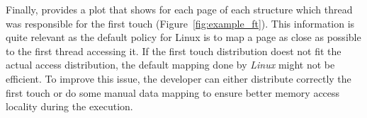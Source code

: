 Finally, \TABARNAC provides a plot that shows for each page of each structure
which thread was responsible for the first touch
(Figure~\ref{fig:example_ft}). This information is quite relevant as the
default policy for Linux is to map a page as close as possible to the first
thread accessing it. If the first touch distribution doest not fit the actual
access distribution, the default mapping done by \emph{Linux} might not be
efficient.  To improve this issue, the developer can either distribute
correctly the first touch or do some manual data mapping to ensure better
memory access locality during the execution.
